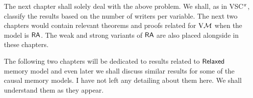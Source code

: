 The next chapter shall solely deal with the above problem. We shall, as in VSC$^\pi$, classify the results based on the number of writers per variable. The next two chapters would contain relevant theorems and proofs related for $\mathrm{V}\mathcal{M}$ when the model is $\mathsf{RA}$. The weak and strong variants of $\mathsf{RA}$ are also placed alongside in these chapters.

The following two chapters will be dedicated to results related to $\mathsf{Relaxed}$ memory model and even later we shall discuss similar results for  some of the causal memory models. I have not left any detailing about them here. We shall understand them as they appear.






